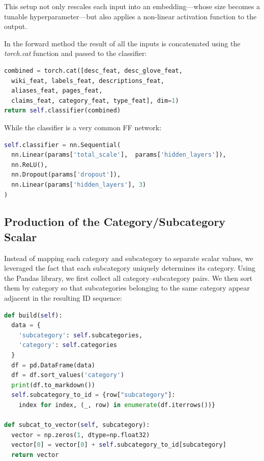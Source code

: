 \documentclass[11pt]{article}
\begin{document}
	This setup not only rescales each input into an embedding—whose size becomes a tunable hyperparameter—but also applies a non-linear activation function to the output.
	
	In the forward method the result of all the inputs is concatenated using the \emph{torch.cat} function and passed to the classifier:
	
	 \scriptsize
	 \begin{lstlisting}[language=python]
combined = torch.cat([desc_feat, desc_glove_feat, 
  wiki_feat, labels_feat, descriptions_feat, 
  aliases_feat, pages_feat,
  claims_feat, category_feat, type_feat], dim=1)
return self.classifier(combined)
	 \end{lstlisting}
	 \normalsize
	 
	 While the classifier is a very common FF network:
	 
	 	 \scriptsize
	 \begin{lstlisting}[language=python]
self.classifier = nn.Sequential(
  nn.Linear(params['total_scale'],  params['hidden_layers']),
  nn.ReLU(),
  nn.Dropout(params['dropout']),
  nn.Linear(params['hidden_layers'], 3)
)
	 \end{lstlisting}
	 \normalsize
	 
	 \subsection{Production of the Category/Subcategory Scalar}
	 
	Instead of mapping each category and subcategory to separate scalar values, we leveraged the fact that each subcategory uniquely determines its category. Using the Pandas library, we first collect all category–subcategory pairs. We then sort them by category so that subcategories belonging to the same category appear adjacent in the resulting ID sequence:
	
	 \scriptsize
	\begin{lstlisting}[language=python]	
def build(self):
  data = {
    'subcategory': self.subcategories,
    'category': self.categories
  }
  df = pd.DataFrame(data)
  df = df.sort_values('category')
  print(df.to_markdown())
  self.subcategory_to_id = {row["subcategory"]: 
    index for index, (_, row) in enumerate(df.iterrows())}

def subcat_to_vector(self, subcategory):
  vector = np.zeros(1, dtype=np.float32)
  vector[0] = vector[0] + self.subcategory_to_id[subcategory]
  return vector
	\end{lstlisting}
	\normalsize
	
\end{document}
